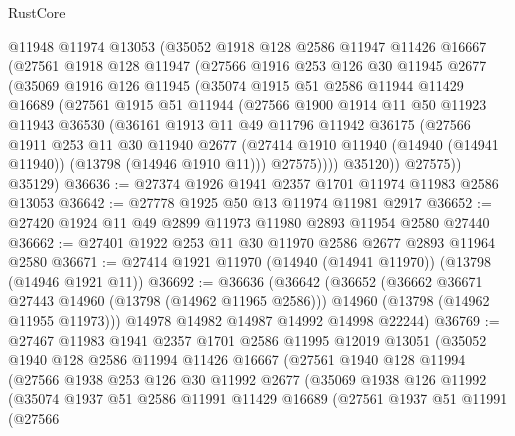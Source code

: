 \begin{lexlean}{RustCore}
\begin{coremodule}
    @11948
    @11974
    @13053
    (@35052
      @1918
      @128
      @2586
      @11947
      @11426
      @16667
      (@27561
        @1918
        @128
        @11947
        (@27566
          @1916
          @253
          @126
          @30
          @11945
          @2677
          (@35069
            @1916
            @126
            @11945
            (@35074
              @1915
              @51
              @2586
              @11944
              @11429
              @16689
              (@27561
                @1915
                @51
                @11944
                (@27566
                  @1900
                  @1914
                  @11
                  @50
                  @11923
                  @11943
                  @36530
                  (@36161
                    @1913
                    @11
                    @49
                    @11796
                    @11942
                    @36175
                    (@27566
                      @1911
                      @253
                      @11
                      @30
                      @11940
                      @2677
                      (@27414 @1910 @11940 (@14940 (@14941 @11940)) (@13798 (@14946 @1910 @11)))
                      @27575))))
              @35120))
          @27575))
      @35129)
@36636 := @27374 @1926 @1941 @2357 @1701 @11974 @11983 @2586 @13053
@36642 := @27778 @1925 @50 @13 @11974 @11981 @2917
@36652 := @27420 @1924 @11 @49 @2899 @11973 @11980 @2893 @11954 @2580 @27440
@36662 := @27401 @1922 @253 @11 @30 @11970 @2586 @2677 @2893 @11964 @2580
@36671 := @27414 @1921 @11970 (@14940 (@14941 @11970)) (@13798 (@14946 @1921 @11))
@36692 := @36636
    (@36642
      (@36652
        (@36662 @36671 @27443 @14960 (@13798 (@14962 @11965 @2586)))
        @14960
        (@13798 (@14962 @11955 @11973)))
      @14978
      @14982
      @14987
      @14992
      @14998
      @22244)
@36769 := @27467
    @11983
    @1941
    @2357
    @1701
    @2586
    @11995
    @12019
    @13051
    (@35052
      @1940
      @128
      @2586
      @11994
      @11426
      @16667
      (@27561
        @1940
        @128
        @11994
        (@27566
          @1938
          @253
          @126
          @30
          @11992
          @2677
          (@35069
            @1938
            @126
            @11992
            (@35074
              @1937
              @51
              @2586
              @11991
              @11429
              @16689
              (@27561
                @1937
                @51
                @11991
                (@27566

\end{coremodule}
\end{lexlean}
